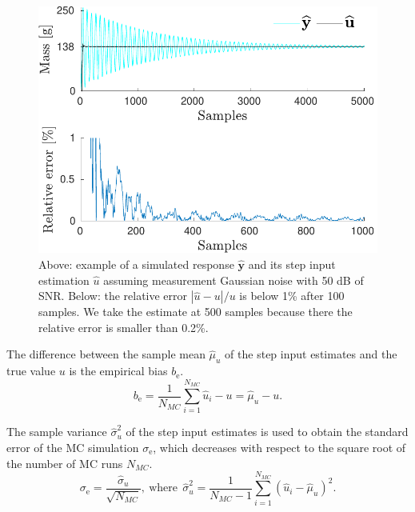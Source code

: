 \begin{figure}[!htb]
\centering
\includegraphics[width=1.0\columnwidth]{./ChapterExperimentalValidation/fig/Fig_1.pdf} 
\caption{ \label{fig:uh_sim} 
Above: example of a simulated response $\widehat{\mathbf{y}}$ and its step input estimation $\widehat{u}$ assuming measurement Gaussian noise with 50 dB of SNR. 
Below: the relative error $|\widehat{u} - u| / u$ is below 1\% after 100 samples. 
We take the estimate at 500 samples because there the relative error is smaller than 0.2\%.  }
\end{figure}

The difference between the sample mean $\widehat{\mu}_u$ of the step input estimates and the true value $u$ is the empirical bias $b_\mathrm{e}$.
\begin{equation} {b}_\mathrm{e} = \frac{1}{N_{MC}} \sum_{i=1}^{N_{MC}}{ \widehat{u}_i - u } = \widehat{\mu}_u - u.  \end{equation}

The sample variance $\widehat{\sigma}_u^2$ of the step input estimates is used to obtain the standard error of the MC simulation $\sigma_\mathrm{e}$, which decreases with respect to the square root of the number of MC runs $N_{MC}$. 
\begin{equation}  \sigma_\mathrm{e} = \frac{\widehat{\sigma}_u}{\sqrt{N_{MC}}}, \ \mathrm{where} \ \ \widehat{\sigma}_u^2 = \frac{1}{N_{MC}-1} \sum_{i=1}^{N_{MC}}{ \left( \widehat{u}_i - \widehat{\mu}_u \right)^2 } . \end{equation}


